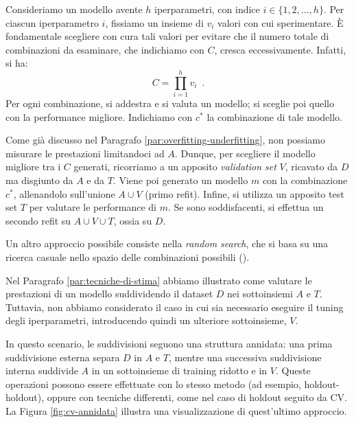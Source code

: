 Consideriamo un modello avente $h$ iperparametri, con indice $i \in \{1,2, \dots, h \}$. Per ciascun iperparametro $i$, fissiamo un insieme di $v_i$ valori con cui sperimentare. È fondamentale scegliere con cura tali valori per evitare che il numero totale di combinazioni da esaminare, che indichiamo con $C$, cresca eccessivamente. Infatti, si ha:
\begin{equation}
    C = \prod_{i=1}^h v_i \enspace .
\end{equation}
Per ogni combinazione, si addestra e si valuta un modello; si sceglie poi quello con la performance migliore. Indichiamo con $c^*$ la combinazione di tale modello.

Come già discusso nel Paragrafo \ref{par:overfitting-underfitting}, non possiamo misurare le prestazioni limitandoci ad $A$. Dunque, per scegliere il modello migliore tra i $C$ generati, ricorriamo a un apposito \textit{validation set} $V$, ricavato da $D$ ma disgiunto da $A$ e da $T$.
Viene poi generato un modello $m$ con la combinazione $c^*$, allenandolo sull'unione $A \cup V$ (primo refit).  
Infine, si utilizza un apposito test set $T$ per valutare le performance di $m$. Se sono soddisfacenti, si effettua un secondo refit su $A \cup V \cup T$, ossia su $D$.

Un altro approccio possibile consiste nella \textit{random search}, che si basa su una ricerca casuale nello spazio delle combinazioni possibili (\cite{bergstra2012random}).

Nel Paragrafo \ref{par:tecniche-di-stima} abbiamo illustrato come valutare le prestazioni di un modello suddividendo il dataset $D$ nei sottoinsiemi $A$ e $T$. Tuttavia, non abbiamo considerato il caso in cui sia necessario eseguire il tuning degli iperparametri, introducendo quindi un ulteriore sottoinsieme, $V$.  

In questo scenario, le suddivisioni seguono una struttura annidata: una prima suddivisione esterna separa $D$ in $A$ e $T$, mentre una successiva suddivisione interna suddivide $A$ in un sottoinsieme di training ridotto e in $V$.  
Queste operazioni possono essere effettuate con lo stesso metodo (ad esempio, holdout-holdout), oppure con tecniche differenti, come nel caso di holdout seguito da CV. La Figura \ref{fig:cv-annidata} illustra una visualizzazione di quest'ultimo approccio.

